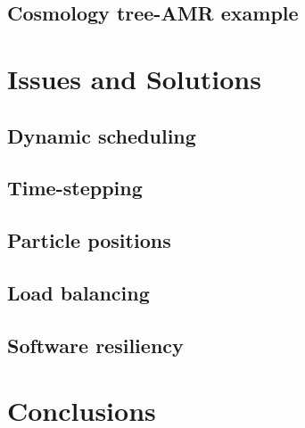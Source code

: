 \documentclass{beamer}
\begin{document}

\subsection{Cosmology tree-AMR example}


\section{Issues and Solutions}
%
\subsection{Dynamic scheduling}

\subsection{Time-stepping}

\subsection{Particle positions}

\subsection{Load balancing}

%
%
\subsection{Software resiliency}

%

\section{Conclusions}


\end{document}
